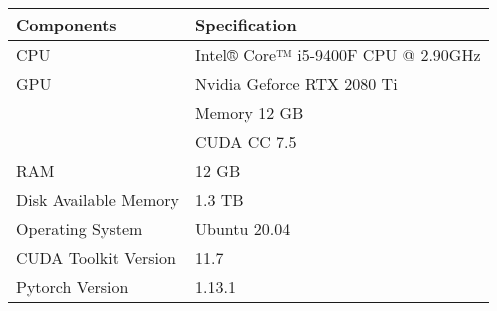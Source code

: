 \begin{tabular}{l l}
  \toprule[1.5pt]
  Components            & Specification\\
  \midrule
  CPU                   &        Intel® Core™ i5-9400F CPU @ 2.90GHz\\
  GPU                   &        Nvidia Geforce RTX 2080 Ti\\
                        &        Memory 12 GB\\
                        &        CUDA CC 7.5\\
  RAM                   &        12 GB\\
  Disk Available Memory &        1.3 TB\\
  Operating System      &        Ubuntu 20.04\\
  CUDA Toolkit Version  &        11.7\\
  Pytorch Version       &        1.13.1\\
  \bottomrule[1.5pt]
\end{tabular}

